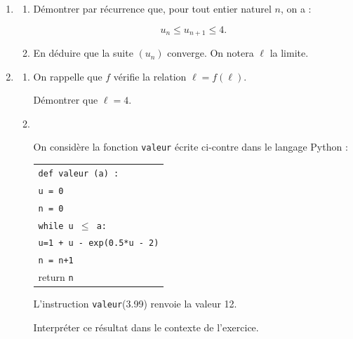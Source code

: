 \medskip

\begin{enumerate}
\item 
	\begin{enumerate}
		\item Démontrer par récurrence que, pour tout entier naturel $n$, on a : 
		
		\[u_n \leqslant u_{n+1} \leqslant 4.\]
		
		\item En déduire que la suite $\left(u_n\right)$ converge. On notera $\ell$ la limite.
	\end{enumerate}	
\item 
	\begin{enumerate}
		\item On rappelle que $f$ vérifie la relation $\ell = f(\ell)$.
		
Démontrer que $\ell  = 4$.
		\item ~
		
\begin{minipage}{0.48\linewidth}On considère la fonction \texttt{valeur} écrite ci-contre dans le langage Python :
		\end{minipage}\hfill 
\begin{minipage}{0.48\linewidth}
\begin{tabular}{|l|}\hline
\texttt{def valeur (a) :}\\
\quad \texttt{u = 0}\\
\quad \texttt{n = 0}\\
\quad \texttt{while u $\leqslant$ a:}\\
\qquad \texttt{u=1 + u - exp(0.5*u - 2)}\\
\qquad \texttt{n = n+1}\\ 
\quad return \texttt{n}\\ \hline
\end{tabular}
\end{minipage}

L'instruction \texttt{valeur}(3.99) renvoie la valeur 12.

Interpréter ce résultat dans le contexte de l'exercice.
	\end{enumerate}
\end{enumerate}

\bigskip
